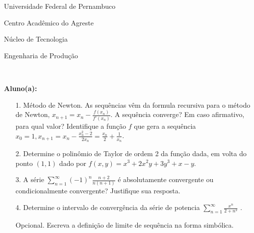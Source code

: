 \documentclass[oneside,a4paper,12pt]{article}
\newcommand{\universidade}{Universidade Federal de Pernambuco}
\newcommand{\centro}{Centro Acadêmico do Agreste}
\newcommand{\departamento}{Núcleo de Tecnologia}
\newcommand{\curso}{Engenharia de Produção}
\begin{document}
	\flushbottom
	\flushright
     \begin{center}
     	\vspace{50pt}
     	
     	\universidade
     	\par
     	\centro
     	\par
     	\departamento
     	\par
     	\curso
     	\par
     	\vspace{08pt}
     	\\
     \end{center}
     
     \begin{flushleft}
     	\textbf{Aluno(a):}
     \end{flushleft}
 
 \begin{itemize}
 	\item[1.] Método de Newton. As sequências vêm da formula recursiva para o método de Newton, $x_{n+1}=x_{n}-\frac{f(x_{n})}{f'(x_{n})}$. A sequência converge? Em caso afirmativo, para qual valor? Identifique a função $f$ que gera a sequência $x_{0}=1, x_{n+1}=x_{n}-\frac{x_{n}^{2}-2}{2x_{n}}=\frac{x_{n}}{2}+\frac{1}{x_{n}}$.
 \end{itemize}
 \begin{itemize}
 	\item[2.] Determine o polinômio de Taylor de ordem 2 da função dada, em volta do ponto $(1,1)$ dado por  $f(x,y)=x^{3}+2x^{2}y+3y^{3}+x-y$. 
 \end{itemize}
 \begin{itemize}
 	\item [3.] A série $\sum_{n=1}^{\infty}(-1)^{n}\frac{n+2}{n(n+1)} $ é absolutamente convergente ou condicionalmente convergente? Justifique sua resposta.
 \end{itemize}
 \begin{itemize}
 	\item[4.] Determine o intervalo de convergência da série de potencia  $\sum_{n=1}^{\infty} \frac{x^{n}}{2+n^{2}} $ .
 \end{itemize}
 \begin{itemize}
 	\item[Opcional.] Escreva a definição de limite de sequência na forma simbólica.
 \end{itemize}
\flushbottom
\flushright
\end{document}
